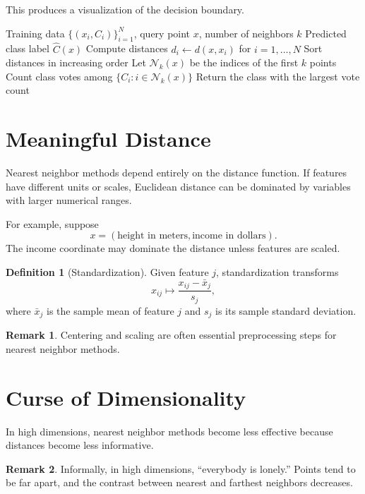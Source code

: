 \documentclass[12pt,oneside]{book}
\numberwithin{equation}{section}
\theoremstyle{definition}
\newtheorem{definition}{Definition}[section]
\newtheorem{remark}{Remark}[section]
\theoremstyle{plain}
\theoremstyle{remark}
\begin{document}
This produces a visualization of the decision boundary.

\begin{algorithm}[H]
\caption{$k$-Nearest Neighbors Classification}
\begin{algorithmic}[1]
\Require Training data $\{(x_i,C_i)\}_{i=1}^N$, query point $x$, number of neighbors $k$
\Ensure Predicted class label $\hat{C}(x)$
\State Compute distances $d_i \gets d(x,x_i)$ for $i=1,\dots,N$
\State Sort distances in increasing order
\State Let $\mathcal{N}_k(x)$ be the indices of the first $k$ points
\State Count class votes among $\{C_i : i \in \mathcal{N}_k(x)\}$
\State Return the class with the largest vote count
\end{algorithmic}
\end{algorithm}

\section{Meaningful Distance}

Nearest neighbor methods depend entirely on the distance function. If features have different units or scales, Euclidean distance can be dominated by variables with larger numerical ranges.

For example, suppose
\[
x=(\text{height in meters}, \text{income in dollars}).
\]
The income coordinate may dominate the distance unless features are scaled.

\begin{definition}[Standardization]
Given feature $j$, standardization transforms
\[
x_{ij}
\mapsto
\frac{x_{ij}-\bar{x}_j}{s_j},
\]
where $\bar{x}_j$ is the sample mean of feature $j$ and $s_j$ is its sample standard deviation.
\end{definition}

\begin{remark}
Centering and scaling are often essential preprocessing steps for nearest neighbor methods.
\end{remark}

\section{Curse of Dimensionality}

In high dimensions, nearest neighbor methods become less effective because distances become less informative.

\begin{remark}
Informally, in high dimensions, ``everybody is lonely.'' Points tend to be far apart, and the contrast between nearest and farthest neighbors decreases.
\end{remark}
\end{document}
